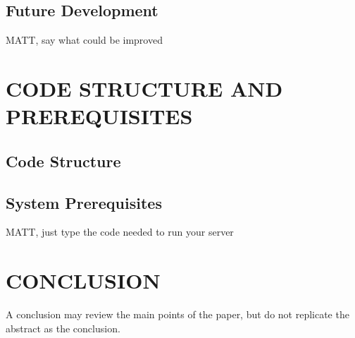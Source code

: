 \documentclass[10pt,twocolumn]{witseiepaper}
\begin{document}
\subsection{Future Development}
\label{sec: Future Development}
MATT, say what could be improved


%
\section{CODE STRUCTURE AND PREREQUISITES}
\label{sec: CODE STRUCTURE AND PREREQUISITES}


\subsection{Code Structure}
\label{sec: Code Structure}

\subsection{System Prerequisites}
\label{sec: System Prerequisites}
MATT, just type the code needed to run your server

%
\section{CONCLUSION}
\label{sec: Conclusion}

A conclusion may review the main points of the paper, but do not replicate the
abstract as the conclusion.


%
%

\end{document}
